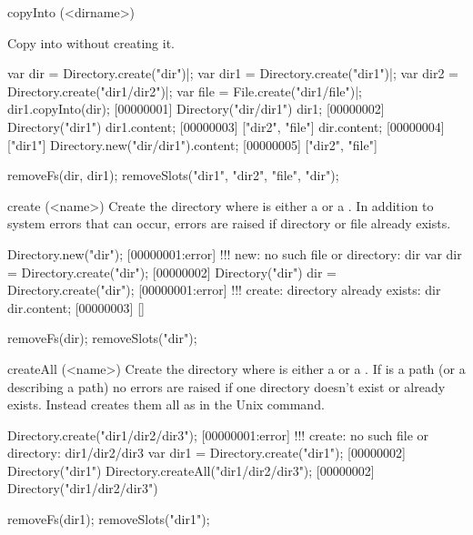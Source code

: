\begin{urbiscriptapi}
\item[copyInto](<dirname>)
  \experimental{}

  Copy \this into  without creating it.
\begin{urbiscript}
var dir = Directory.create("dir")|;
var dir1 = Directory.create("dir1")|;
var dir2 = Directory.create("dir1/dir2")|;
var file = File.create("dir1/file")|;
dir1.copyInto(dir);
[00000001] Directory("dir/dir1")
dir1;
[00000002] Directory("dir1")
dir1.content;
[00000003] ["dir2", "file"]
dir.content;
[00000004] ["dir1"]
Directory.new("dir/dir1").content;
[00000005] ["dir2", "file"]
\end{urbiscript}
\begin{urbicomment}
removeFs(dir, dir1);
removeSlots("dir1", "dir2", "file", "dir");
\end{urbicomment}


\item[create](<name>)
  Create the directory  where  is either a
   or a . In addition to system errors that
  can occur, errors are raised if directory or file  already exists.
\begin{urbiscript}
Directory.new("dir");
[00000001:error] !!! new: no such file or directory: dir
var dir = Directory.create("dir");
[00000002] Directory("dir")
dir = Directory.create("dir");
[00000001:error] !!! create: directory already exists: dir
dir.content;
[00000003] []
\end{urbiscript}
\begin{urbicomment}
removeFs(dir);
removeSlots("dir");
\end{urbicomment}


\item[createAll](<name>)
  Create the directory  where  is either a
   or a . If  is a
  path (or a  describing a path) no errors are
  raised if one directory doesn't exist or already exists. Instead
   creates them all as in the Unix  command.
\begin{urbiscript}
Directory.create("dir1/dir2/dir3");
[00000001:error] !!! create: no such file or directory: dir1/dir2/dir3
var dir1 = Directory.create("dir1");
[00000002] Directory("dir1")
Directory.createAll("dir1/dir2/dir3");
[00000002] Directory("dir1/dir2/dir3")
\end{urbiscript}
\begin{urbicomment}
removeFs(dir1);
removeSlots("dir1");
\end{urbicomment}



\end{urbiscriptapi}

